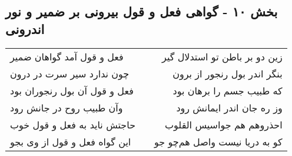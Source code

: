 \begin{center}
\section*{بخش ۱۰ - گواهی فعل و قول بیرونی بر ضمیر و نور اندرونی}
\label{sec:sh010}
\begin{longtable}{l p{0.5cm} r}
فعل و قول آمد گواهان ضمیر
&&
زین دو بر باطن تو استدلال گیر
\\
چون ندارد سیر سرت در درون
&&
بنگر اندر بول رنجور از برون
\\
فعل و قول آن بول رنجوران بود
&&
که طبیب جسم را برهان بود
\\
وآن طبیب روح در جانش رود
&&
وز ره جان اندر ایمانش رود
\\
حاجتش ناید به فعل و قول خوب
&&
احذروهم هم جواسیس القلوب
\\
این گواه فعل و قول از وی بجو
&&
کو به دریا نیست واصل هم‌چو جو
\\
\end{longtable}
\end{center}
